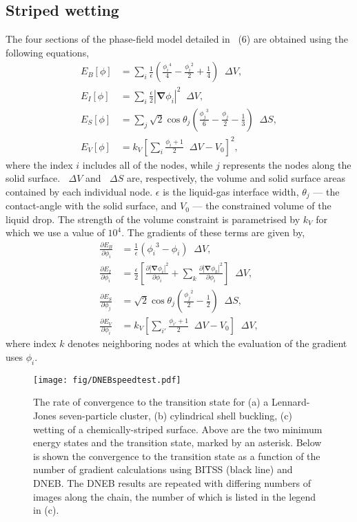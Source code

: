 \documentclass[aps,prl]{revtex4}
\newcommand{\abs}[1]{\left| #1 \right|}
\newcommand{\grad}{\bm{\nabla}}
\newcommand{\upDelta}{\mathop{}\!\Delta}
\begin{document}
\subsection{Striped wetting}
The four sections of the phase-field model detailed in ~(6) are obtained using the following equations,
\begin{align}
  E_B[\phi] &= \sum_i \frac{1}{\epsilon} \left( \frac{{\phi_i}^4}{4} - \frac{{\phi_i}^2}{2} + \frac{1}{4} \right) \upDelta V,\\
  E_I[\phi] &= \sum_i \frac{\epsilon}{2} \abs{\grad \phi_i}^2 \upDelta V,\\
  E_S[\phi] &= \sum_j \sqrt{2}\cos\theta_j \left( \frac{{\phi_j}^3}{6} - \frac{\phi_j}{2} - \frac{1}{3} \right) \upDelta S,\\
  E_V[\phi] &= k_V \left[ \sum_i \frac{\phi_i + 1}{2} \upDelta V - V_0 \right]^2,
\end{align}
where the index $i$ includes all of the nodes, while $j$ represents the nodes along the solid surface.
$\upDelta V$ and $\upDelta S$ are, respectively, the volume and solid surface areas contained by each individual node.
$\epsilon$ is the liquid-gas interface width, $\theta_j$ --- the contact-angle with the solid surface, and $V_0$ --- the constrained volume of the liquid drop.
The strength of the volume constraint is parametrised by $k_V$ for which we use a value of $10^4$.
The gradients of these terms are given by,
\begin{align}
  \frac{\partial E_B}{\partial \phi_i} &= \frac{1}{\epsilon} \left( {\phi_i}^3 - \phi_i \right) \upDelta V,\\
  \frac{\partial E_I}{\partial \phi_i} &= \frac{\epsilon}{2} \left[
    \frac{\partial \abs{\grad \phi_i}^2}{\partial \phi_i} +
    \sum_k\frac{\partial \abs{\grad \phi_k}^2}{\partial \phi_i} \right] \upDelta V,\\
  \frac{\partial E_S}{\partial \phi_j} &= \sqrt{2}\cos\theta_j \left( \frac{{\phi_j}^2}{2} - \frac{1}{2} \right) \upDelta S,\\
  \frac{\partial E_V}{\partial \phi_i} &= k_V \left[ \sum_{i'} \frac{\phi_{i'} + 1}{2} \upDelta V - V_0 \right] \upDelta V,
\end{align}
where index $k$ denotes neighboring nodes at which the evaluation of the gradient uses $\phi_i$.

\begin{figure}[htb]
  \texttt{[image: fig/DNEBspeedtest.pdf]}
  \caption{\label{fig:DNEBspeedtest}
    The rate of convergence to the transition state for (a) a Lennard-Jones seven-particle cluster, (b) cylindrical shell buckling, (c) wetting of a chemically-striped surface.
    Above are the two minimum energy states and the transition state, marked by an asterisk.
    Below is shown the convergence to the transition state as a function of the number of gradient calculations using BITSS (black line) and DNEB.
    The DNEB results are repeated with differing numbers of images along the chain, the number of which is listed in the legend in (c).
  }
\end{figure}
\end{document}
